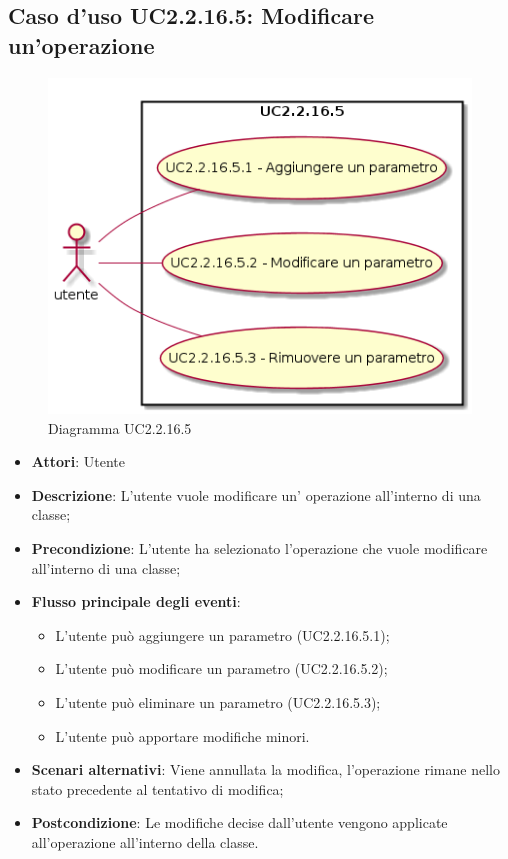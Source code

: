 \documentclass[../AnalisiDeiRequisiti.tex]{subfiles}
\begin{document}
			\subsection{Caso d'uso UC2.2.16.5: Modificare un'operazione}
			\begin{figure} [H]
				\centering
				\includegraphics[scale=0.45]{./Figures/UC2.2.16.5.png}
				\caption{Diagramma UC2.2.16.5}\label{}
			\end{figure}
			\begin{itemize}
				\item \textbf{Attori}: Utente
				\item \textbf{Descrizione}: L'utente vuole modificare un' operazione all'interno di una classe;
				\item \textbf{Precondizione}: L'utente ha selezionato l'operazione che vuole modificare all'interno di una classe;
				\item \textbf{Flusso principale degli eventi}: \begin{itemize}
					\item L'utente può aggiungere un parametro (UC2.2.16.5.1);
					\item L'utente può modificare un parametro (UC2.2.16.5.2);
					\item L'utente può eliminare un parametro (UC2.2.16.5.3);
					\item L'utente può apportare modifiche minori.
				\end{itemize}
				\item \textbf{Scenari alternativi}: Viene annullata la modifica, l'operazione rimane nello stato precedente al tentativo di modifica;
				\item \textbf{Postcondizione}: Le modifiche decise dall'utente vengono applicate all'operazione all'interno della classe.
			\end{itemize}
\end{document}
